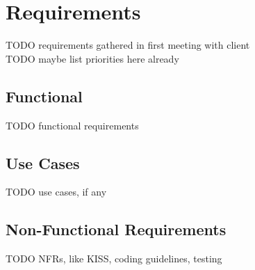\chapter{Requirements}
TODO requirements gathered in first meeting with client\\
TODO maybe list priorities here already\\

\section{Functional}
TODO functional requirements\\

\section{Use Cases}
TODO use cases, if any\\

\section{Non-Functional Requirements}
TODO NFRs, like KISS, coding guidelines, testing\\
